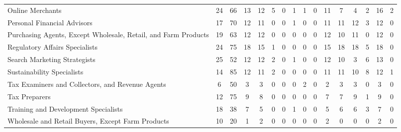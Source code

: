 \begin{sidewaystable}
{\begin{threeparttable}[t]
\begin{tabular}{lcc|ccccccccccccc}
Online Merchants & 24 & 66 & 13 & 12 & 5 & 0 & 1 & 1 & 0 & 11 & 7 & 4 & 2 & 16 & 2 \\
Personal Financial Advisors & 17 & 70 & 12 & 11 & 0 & 0 & 1 & 0 & 0 & 11 & 11 & 12 & 3 & 12 & 0 \\
Purchasing Agents, Except Wholesale, Retail, and Farm Products & 19 & 63 & 12 & 12 & 0 & 0 & 0 & 0 & 0 & 12 & 10 & 11 & 0 & 12 & 0 \\
Regulatory Affairs Specialists & 24 & 75 & 18 & 15 & 1 & 0 & 0 & 0 & 0 & 15 & 18 & 18 & 5 & 18 & 0 \\
Search Marketing Strategists & 25 & 52 & 12 & 12 & 2 & 0 & 1 & 0 & 0 & 12 & 10 & 3 & 6 & 13 & 0 \\
Sustainability Specialists & 14 & 85 & 12 & 11 & 2 & 0 & 0 & 0 & 0 & 11 & 11 & 10 & 8 & 12 & 1 \\
Tax Examiners and Collectors, and Revenue Agents & 6 & 50 & 3 & 3 & 0 & 0 & 0 & 2 & 0 & 2 & 3 & 3 & 0 & 3 & 0 \\
Tax Preparers & 12 & 75 & 9 & 8 & 0 & 0 & 0 & 0 & 0 & 7 & 7 & 9 & 1 & 9 & 0 \\
Training and Development Specialists & 18 & 38 & 7 & 5 & 0 & 0 & 1 & 0 & 0 & 5 & 6 & 6 & 3 & 7 & 0 \\
Wholesale and Retail Buyers, Except Farm Products & 10 & 20 & 1 & 2 & 0 & 0 & 0 & 0 & 0 & 2 & 0 & 0 & 0 & 2 & 0 \\
\bottomrule
\end{tabular}

\end{threeparttable}
}

  \end{sidewaystable}